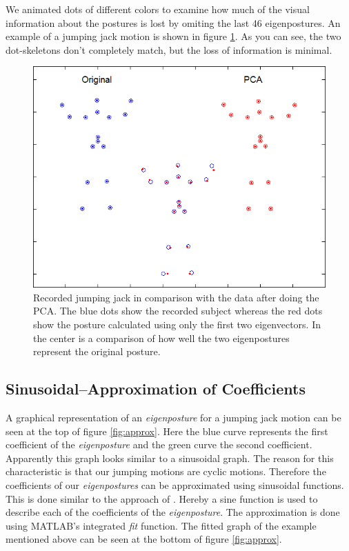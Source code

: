\documentclass[a4paper]{article}
\begin{document}
We animated dots of different colors to examine how much of the visual information about the postures is lost by omiting the last 46 eigenpostures.
An example of a jumping jack motion is shown in figure \ref{fig:orig_pca_1}.
As you can see, the two dot-skeletons don't completely match, but the loss of information is minimal.

\begin{figure}
		\centering
		\includegraphics[height=0.3\textheight]{comparison_Original_PCA.png}
		\caption{Recorded jumping jack in comparison with the data after doing the PCA.
		The blue dots show the recorded subject whereas the red dots show the posture calculated using only the first two eigenvectors.
		In the center is a comparison of how well the two eigenpostures represent the original posture.
		}
		\label{fig:orig_pca_1}
\end{figure}


\subsection{Sinusoidal--Approximation of Coefficients}
A graphical representation of an \emph{eigenposture} for a jumping jack motion can be seen at the top of figure \ref{fig:approx}.
Here the blue curve represents the first coefficient of the \emph{eigenposture} and the green curve the second coefficient.
Apparently this graph looks similar to a sinusoidal graph.
The reason for this characteristic is that our jumping motions are cyclic motions.
Therefore the coefficients of our \emph{eigenpostures} can be approximated using sinusoidal functions.
This is done similar to the approach of \cite{origin}.
Hereby a sine function is used to describe each of the coefficients of the \emph{eigenposture}.
The approximation is done using MATLAB's integrated \emph{fit} function.
The fitted graph of the example mentioned above can be seen at the bottom of figure \ref{fig:approx}.
\end{document}
